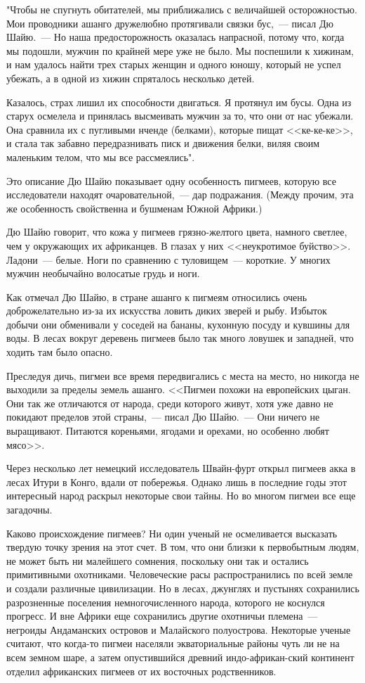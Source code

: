 \documentclass[12pt,a4paper,twoside,openany,svgnames]{memoir}
\begin{document}
"Чтобы не спугнуть обитателей, мы приближались с величайшей осторожностью. Мои проводники ашанго дружелюбно протягивали связки бус,~--- писал Дю Шайю.~--- Но наша предосторожность оказалась напрасной, потому что, когда мы подошли, мужчин по крайней мере уже не было. Мы поспешили к хижинам, и нам удалось найти трех старых женщин и одного юношу, который не успел убежать, а в одной из хижин спряталось несколько детей.

Казалось, страх лишил их способности двигаться. Я протянул им бусы. Одна из старух осмелела и принялась высмеивать мужчин за то, что они от нас убежали. Она сравнила их с пугливыми нченде (белками), которые пищат <<ке-ке-ке>>, и стала так забавно передразнивать писк и движения белки, виляя своим маленьким телом, что мы все рассмеялись".

Это описание Дю Шайю показывает одну особенность пигмеев, которую все исследователи находят очаровательной,~--- дар подражания. (Между прочим, эта же особенность свойственна и бушменам Южной Африки.)

Дю Шайю говорит, что кожа у пигмеев грязно-желтого цвета, намного светлее, чем у окружающих их африканцев. В глазах у них <<неукротимое буйство>>. Ладони~--- белые. Ноги по сравнению с туловищем~--- короткие. У многих мужчин необычайно волосатые грудь и ноги.

Как отмечал Дю Шайю, в стране ашанго к пигмеям относились очень доброжелательно из-за их искусства ловить диких зверей и рыбу. Избыток добычи они обменивали у соседей на бананы, кухонную посуду и кувшины для воды. В лесах вокруг деревень пигмеев было так много ловушек и западней, что ходить там было опасно.

Преследуя дичь, пигмеи все время передвигались с места на место, но никогда не выходили за пределы земель ашанго. <<Пигмеи похожи на европейских цыган. Они так же отличаются от народа, среди которого живут, хотя уже давно не покидают пределов этой страны,~--- писал Дю Шайю.~--- Они ничего не выращивают. Питаются кореньями, ягодами и орехами, но особенно любят мясо>>.

Через несколько лет немецкий исследователь Швайн-фурт открыл пигмеев акка в лесах Итури в Конго, вдали от побережья. Однако лишь в последние годы этот интересный народ раскрыл некоторые свои тайны. Но во многом пигмеи все еще загадочны.

Каково происхождение пигмеев? Ни один ученый не осмеливается высказать твердую точку зрения на этот счет. В том, что они близки к первобытным людям, не может быть ни малейшего сомнения, поскольку они так и остались примитивными охотниками. Человеческие расы распространились по всей земле и создали различные цивилизации. Но в лесах, джунглях и пустынях сохранились разрозненные поселения немногочисленного народа, которого не коснулся прогресс. И вне Африки еще сохранились другие охотничьи племена~--- негроиды Андаманских островов и Малайского полуострова. Некоторые ученые считают, что когда-то пигмеи населяли экваториальные районы чуть ли не на всем земном шаре, а затем опустившийся древний индо-африкан-ский континент отделил африканских пигмеев от их восточных родственников.
\end{document}
